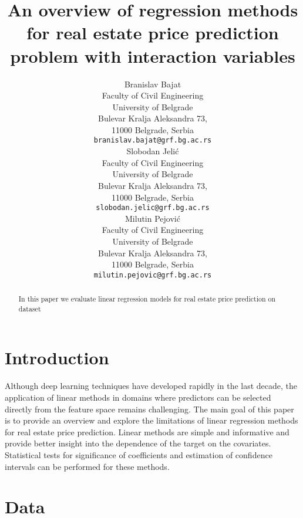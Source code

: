 \documentclass{article}
\title{An overview of regression methods for real estate price prediction problem with interaction variables}
\author{
 Branislav Bajat \\
  Faculty of Civil Engineering\\
  University of Belgrade\\
  Bulevar Kralja Aleksandra 73,\\
  11000 Belgrade, Serbia\\
  \texttt{branislav.bajat@grf.bg.ac.rs} \\
  \And
  Slobodan Jelić \\
  Faculty of Civil Engineering\\
  University of Belgrade\\
  Bulevar Kralja Aleksandra 73,\\
  11000 Belgrade, Serbia\\
  \texttt{slobodan.jelic@grf.bg.ac.rs} \\
\And
Milutin Pejović \\
Faculty of Civil Engineering\\
University of Belgrade\\
Bulevar Kralja Aleksandra 73,\\
11000 Belgrade, Serbia\\
\texttt{milutin.pejovic@grf.bg.ac.rs} \\
}
\begin{document}
\maketitle
\begin{abstract}
In this paper we evaluate linear regression models for real estate price prediction on dataset 
\end{abstract}


\section{Introduction}
Although deep learning techniques have developed rapidly in the last decade, the application of linear methods in domains where predictors can be selected directly from the feature space remains challenging. The main goal of this paper is to provide an overview and explore the limitations of linear regression methods for real estate price prediction. Linear methods are simple and informative and provide better insight into the dependence of the target on the covariates. Statistical tests for significance of coefficients and estimation of confidence intervals can be performed for these methods.
\section{Data}
\end{document}
